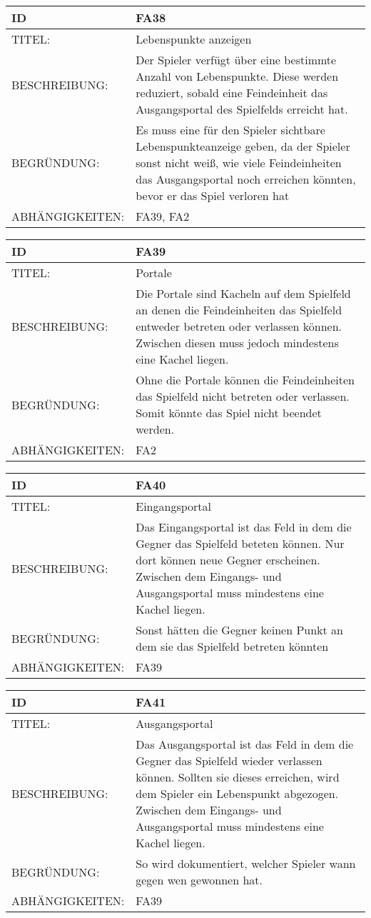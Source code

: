 \documentclass{uulm-assignment}
\begin{document}
\begin{tabularx}{16cm}{l|X}
\textbf{ID} & \textbf{FA38} \\
\hline
TITEL: & Lebenspunkte anzeigen \\
\hline
BESCHREIBUNG: & Der Spieler verfügt über eine bestimmte Anzahl von Lebenspunkte. Diese werden reduziert, sobald eine Feindeinheit das Ausgangsportal des Spielfelds erreicht hat.
\\
\hline
BEGRÜNDUNG: & Es muss eine für den Spieler sichtbare Lebenspunkteanzeige geben, da der Spieler sonst nicht weiß, wie viele Feindeinheiten das Ausgangsportal noch erreichen könnten, bevor er das Spiel verloren hat \\
\hline
ABHÄNGIGKEITEN: &FA39, FA2 \\
\end{tabularx}

\begin{tabularx}{16cm}{l|X}
\textbf{ID} & \textbf{FA39} \\
\hline
TITEL: & Portale \\
\hline
BESCHREIBUNG: & Die Portale sind Kacheln auf dem Spielfeld an denen die Feindeinheiten das Spielfeld entweder betreten oder verlassen können. Zwischen diesen muss jedoch mindestens eine Kachel liegen. 
\\
\hline
BEGRÜNDUNG: & Ohne die Portale können die Feindeinheiten das Spielfeld nicht betreten oder verlassen. Somit könnte das Spiel nicht beendet werden. \\
\hline
ABHÄNGIGKEITEN: & FA2\\
\end{tabularx}

\begin{tabularx}{16cm}{l|X}
\textbf{ID} & \textbf{FA40} \\
\hline
TITEL: & Eingangsportal \\
\hline
BESCHREIBUNG: & Das Eingangsportal ist das Feld in dem die Gegner das Spielfeld beteten können. Nur dort können neue Gegner erscheinen. Zwischen dem Eingangs- und Ausgangsportal muss mindestens eine Kachel liegen.
\\
\hline
BEGRÜNDUNG: &  Sonst hätten die Gegner keinen Punkt an dem sie das Spielfeld betreten könnten\\
\hline
ABHÄNGIGKEITEN: &FA39 \\
\end{tabularx}

\begin{tabularx}{16cm}{l|X}
\textbf{ID} & \textbf{FA41} \\
\hline
TITEL: & Ausgangsportal \\
\hline
BESCHREIBUNG: & Das Ausgangsportal ist das Feld in dem die Gegner das Spielfeld wieder verlassen können. Sollten sie dieses erreichen, wird dem Spieler ein Lebenspunkt abgezogen. Zwischen dem Eingangs- und Ausgangsportal muss mindestens eine Kachel liegen.
\\
\hline
BEGRÜNDUNG: & So wird dokumentiert, welcher Spieler wann gegen wen gewonnen hat. \\
\hline
ABHÄNGIGKEITEN: & FA39\\ 
\end{tabularx}
\end{document}
